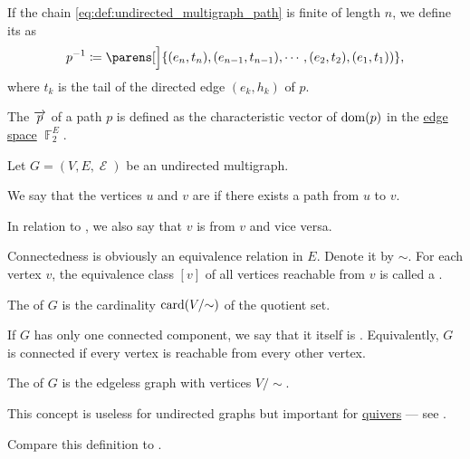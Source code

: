 \begin{definition}
\begin{thmenum}
     If the chain \eqref{eq:def:undirected_multigraph_path} is finite of length \( n \), we define its  as
    \begin{equation*}
      p^{-1} \coloneqq \parens[\Big]{ (e_n, t_n), (e_{n-1}, t_{n-1}), \cdots, (e_2, t_2), (e_1, t_1)) },
    \end{equation*}
    where \( t_k \) is the tail of the directed edge \( (e_k, h_k) \) of \( p \).

     The  \( \overrightarrow{p} \) of a path \( p \) is defined as the characteristic vector of \( \operatorname{dom}(p) \) in the \hyperref[def:hypergraph_vector_spaces/edge]{edge space} \( \BbbF_2^E \).
  \end{thmenum}
\end{definition}

\begin{definition}\label{def:undirected_multigraph_connectedness}
  Let \( G = (V, E, \mscrE) \) be an undirected multigraph.

  \begin{thmenum}
     We say that the vertices \( u \) and \( v \) are  if there exists a path from \( u \) to \( v \).

    In relation to , we also say that \( v \) is  from \( v \) and vice versa.

     Connectedness is obviously an equivalence relation in \( E \). Denote it by \( {\sim} \). For each vertex \( v \), the equivalence class \( [v] \) of all vertices reachable from \( v \) is called a .

    The  of \( G \) is the cardinality \( \operatorname{card}(V / {\sim}) \) of the quotient set.

    If \( G \) has only one connected component, we say that it itself is . Equivalently, \( G \) is connected if every vertex is reachable from every other vertex.

     The  of \( G \) is the edgeless graph with vertices \( V / {\sim} \).

    This concept is useless for undirected graphs but important for \hyperref[def:quiver]{quivers} --- see .
  \end{thmenum}

  Compare this definition to .
\end{definition}
